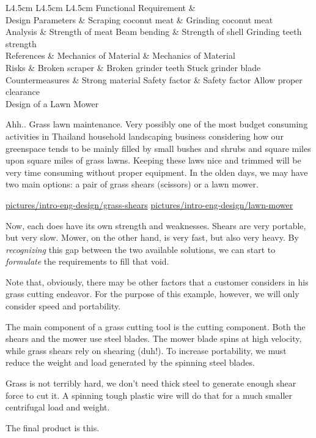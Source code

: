 \documentclass[a4paper,openany,12pt]{book}
\begin{document}
 L4.5cm L4.5cm L4.5cm Functional Requirement \&\\
Design Parameters \& Scraping coconut meat \& Grinding coconut meat\\
Analysis \& Strength of meat Beam bending \& Strength of shell Grinding
teeth strength\\
References \& Mechanics of Material \& Mechanics of Material\\
Risks \& Broken scraper \& Broken grinder teeth Stuck grinder blade\\
Countermeasures \& Strong material Safety factor \& Safety factor Allow
proper clearance\\

Design of a Lawn Mower

Ahh.. Grass lawn maintenance. Very possibly one of the most budget
consuming activities in Thailand household landscaping business
considering how our greenspace tends to be mainly filled by small bushes
and shrubs and square miles upon square miles of grass lawns. Keeping
these laws nice and trimmed will be very time consuming without proper
equipment. In the olden days, we may have two main options: a pair of
grass shears (scissors) or a lawn mower.


\url{pictures/intro-eng-design/grass-shears}
\url{pictures/intro-eng-design/lawn-mower}

Now, each does have its own strength and weaknesses. Shears are very
portable, but very slow. Mower, on the other hand, is very fast, but
also very heavy. By \emph{recognizing} this gap between the two available
solutions, we can start to \emph{formulate} the requirements to fill that
void.


Note that, obviously, there may be other factors that a customer
considers in his grass cutting endeavor. For the purpose of this
example, however, we will only consider speed and portability.

The main component of a grass cutting tool is the cutting component.
Both the shears and the mower use steel blades. The mower blade spins at
high velocity, while grass shears rely on shearing (duh!). To increase
portability, we must reduce the weight and load generated by the
spinning steel blades.

Grass is not terribly hard, we don't need thick steel to generate enough
shear force to cut it. A spinning tough plastic wire will do that for a
much smaller centrifugal load and weight.

The final product is this.
\end{document}
